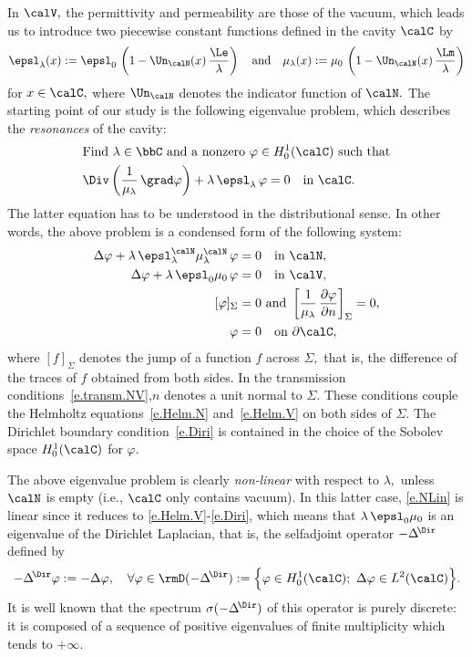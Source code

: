 In $\calV,$ the permittivity and permeability are those of the vacuum, which leads us to introduce two piecewise constant functions defined in the cavity $\calC$ by
\begin{equation}\label{e.def-eps-mu}
\epsl_\lambda(x) := \epsl_0\, \left(1 - \Un_\calN(x)\,\frac{\Le}{\lambda} \right)
\quad\text{and}\quad
\mu_\lambda(x) := \mu_0\, \left(1 - \Un_\calN(x)\,\frac{\Lm}{\lambda} \right)
\end{equation}
for $x \in \calC,$ where $\Un_\calN$ denotes the indicator function of $\calN.$ The starting point of our study is the following eigenvalue problem, which describes the \emph{resonances} of the cavity:
\begin{align}
& \text{Find } \lambda \in \bbC \text{ and a nonzero } \varphi \in H^1_0(\calC) \text{ such that} \nonumber \\
& \Div \left(\frac{1}{\mu_\lambda}\, \grad\varphi \right) + \lambda\,\epsl_\lambda\,\varphi = 0
\quad\text{in }\calC. \label{e.NLin}
\end{align}
The latter equation has to be understood in the distributional sense. In other words, the above problem is a condensed form of the following system:
\begin{subequations}
\begin{align}
 \Delta\varphi + \lambda\,\epsl_\lambda^\calN \mu_\lambda^\calN\, \varphi &= 0
\quad\text{in }\calN, \label{e.Helm.N}
\\ \Delta\varphi + \lambda\,\epsl_0 \mu_0\,\varphi &= 0
\quad\text{in }\calV, \label{e.Helm.V}
\\
[\varphi]_\Sigma &= 0 \text{ and } \left[\frac{1}{\mu_\lambda}\,\frac{\partial\varphi}{\partial n} \right]_\Sigma = 0, \label{e.transm.NV}
\\ 
\varphi &= 0 \quad\text{on }\partial\calC, \label{e.Diri}
\end{align}
\end{subequations}
where $[f]_\Sigma$ denotes the jump of a function $f$ across $\Sigma,$ that is, the difference of the traces of $f$ obtained from both sides. In the transmission conditions~\eqref{e.transm.NV},\linebreak$n$ denotes a unit normal to $\Sigma.$ These conditions couple the Helmholtz equations~\eqref{e.Helm.N} and~\eqref{e.Helm.V} on both sides of $\Sigma.$ The Dirichlet boundary condition~\eqref{e.Diri} is contained in the choice of the Sobolev space $H^1_0(\calC)$ for $\varphi.$

The above eigenvalue problem is clearly \emph{non-linear} with respect to $\lambda,$ unless $\calN$ is empty (i.e., $\calC$ only contains vacuum). In this latter case, \eqref{e.NLin} is linear since it reduces to \eqref{e.Helm.V}-\eqref{e.Diri}, which means that $\lambda\,\epsl_0\mu_0$ is an eigenvalue of the Dirichlet Laplacian, that is, the selfadjoint operator $-\Delta^{\!\Dir}$ defined by
\[
-\Delta^{\!\Dir} \varphi := -\Delta \varphi,
\quad\forall \varphi \in \rmD(-\Delta^{\!\Dir}) := \Big\{ \varphi \in H^1_0(\calC); \
\Delta\varphi \in L^2(\calC) \Big\}.
\]
It is well known that the spectrum $\sigma(-\Delta^{\!\Dir})$ of this operator is purely discrete: it is composed of a sequence of positive eigenvalues of finite multiplicity which tends to $+\infty.$

